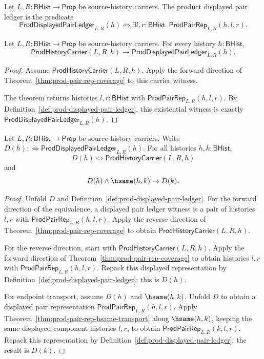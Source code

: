\begin{definition}\label{def:prod-displayed-pair-ledger}
Let $L,R:\mathsf{BHist}\to\mathsf{Prop}$ be source-history carriers. The product
displayed pair ledger is the predicate
$$
\mathsf{ProdDisplayedPairLedger}_{L,R}(h)
\Longleftrightarrow
\exists l,r:\mathsf{BHist}.\;\mathsf{ProdPairRep}_{L,R}(h,l,r).
$$
\end{definition}

\begin{theorem}\label{thm:prod-displayed-pair-ledger-soundness}
Let $L,R:\mathsf{BHist}\to\mathsf{Prop}$ be source-history carriers. For every
history $h:\mathsf{BHist}$,
$$
\mathsf{ProdHistoryCarrier}(L,R,h)
\to
\mathsf{ProdDisplayedPairLedger}_{L,R}(h).
$$
\end{theorem}
\begin{proof}
Assume $\mathsf{ProdHistoryCarrier}(L,R,h)$. Apply the forward direction of
Theorem~\ref{thm:prod-pair-rep-coverage} to this carrier witness.

The theorem returns histories $l,r:\mathsf{BHist}$ with
$\mathsf{ProdPairRep}_{L,R}(h,l,r)$. By
Definition~\ref{def:prod-displayed-pair-ledger}, this existential witness is
exactly $\mathsf{ProdDisplayedPairLedger}_{L,R}(h)$.
\end{proof}

\begin{theorem}
\label{thm:prod-displayed-pair-ledger-exact-and-transport}
Let $L,R:\mathsf{BHist}\to\mathsf{Prop}$ be source-history carriers. Write
$D(h):\Longleftrightarrow\mathsf{ProdDisplayedPairLedger}_{L,R}(h)$. For all
histories $h,k:\mathsf{BHist}$,
$$
D(h)\Longleftrightarrow\mathsf{ProdHistoryCarrier}(L,R,h)
$$
and
$$
D(h)\land\hsame(h,k)\to D(k).
$$
\end{theorem}
\begin{proof}
Unfold $D$ and Definition~\ref{def:prod-displayed-pair-ledger}. For the
forward direction of the equivalence, a displayed pair ledger witness is a pair
of histories $l,r$ with $\mathsf{ProdPairRep}_{L,R}(h,l,r)$. Apply the reverse
direction of Theorem~\ref{thm:prod-pair-rep-coverage} to obtain
$\mathsf{ProdHistoryCarrier}(L,R,h)$.

For the reverse direction, start with
$\mathsf{ProdHistoryCarrier}(L,R,h)$. Apply the forward direction of
Theorem~\ref{thm:prod-pair-rep-coverage} to obtain histories $l,r$ with
$\mathsf{ProdPairRep}_{L,R}(h,l,r)$. Repack this displayed representation by
Definition~\ref{def:prod-displayed-pair-ledger}; this is $D(h)$.

For endpoint transport, assume $D(h)$ and $\hsame(h,k)$. Unfold $D$ to obtain a
displayed pair representation $\mathsf{ProdPairRep}_{L,R}(h,l,r)$. Apply
Theorem~\ref{thm:prod-pair-rep-hsame-transport} along $\hsame(h,k)$, keeping the
same displayed component histories $l,r$, to obtain
$\mathsf{ProdPairRep}_{L,R}(k,l,r)$. Repack this representation by
Definition~\ref{def:prod-displayed-pair-ledger}; the result is $D(k)$.
\end{proof}

